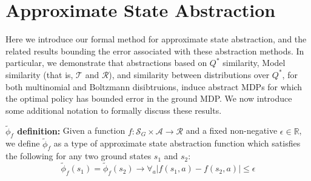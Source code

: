 \documentclass{article}
\newcommand{\ep}{\widetilde \phi}
\begin{document}



%


\section{Approximate State Abstraction}

Here we introduce our formal method for approximate state abstraction, and the related results bounding the error associated with these abstraction methods. In particular, we demonstrate that abstractions based on $Q^*$ similarity, Model similarity (that is, $\mathcal{T}$ and $\mathcal{R}$), and similarity between distributions over $Q^*$, for both multinomial and Boltzmann disibtruions, induce abstract MDPs for which the optimal policy has bounded error in the ground MDP. We now introduce some additional notation to formally discuss these results.

{\bf $\ep_f$ definition:} Given a function $f : \mathcal{S}_G \times \mathcal{A} \rightarrow \mathcal{R}$ and a fixed non-negative $\epsilon \in \mathbb{R}$, we define $\ep_f$ as a type of approximate state abstraction function which satisfies the following for any two ground states $s_1$ and $s_2$: 
\begin{equation}
\label{eq:phi_f}
\ep_f(s_1) = \ep_f(s_2) \rightarrow \forall_a \left|f(s_1, a) - f(s_2, a)\right| \leq \epsilon
\end{equation}
\end{document}
